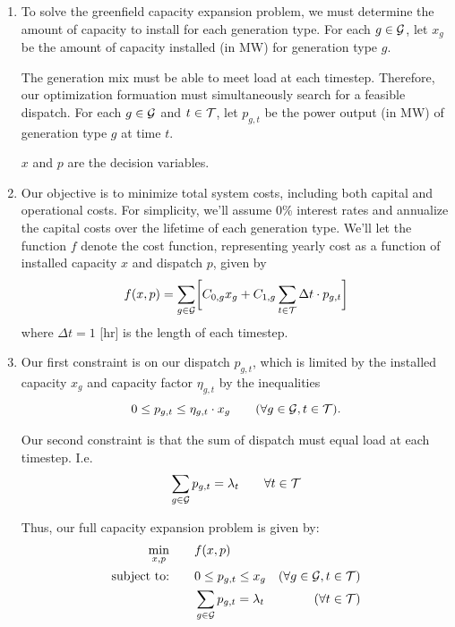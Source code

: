 \documentclass{homework}
\begin{document}
\begin{enumerate}
In summary, our parameters are $\eta$, $\lambda$, $C_0$ and $C_1$. 
(We drop the subscripts to denote the full vector/matrix across all members of pertinent sets.)

\item To solve the greenfield capacity expansion problem, we must determine the amount of capacity to install
for each generation type. For each $g\in \mathcal{G}$, let $x_g$ be the amount of capacity installed (in MW) for generation
type $g$.

The generation mix must be able to meet load at each timestep. Therefore, our optimization formuation must
simultaneously search for a feasible dispatch. For each $g\in\mathcal{G}$ and $t \in \mathcal{T}$, let $p_{g, t}$ be the power
output (in MW) of generation type $g$ at time $t$.

$x$ and $p$ are the decision variables.

\item Our objective is to minimize total system costs, including both capital and operational costs. For simplicity,
we'll assume 0\% interest rates and annualize the capital costs over the lifetime of each generation type. We'll
let the function $f$ denote the cost function, representing yearly cost as a function of installed capacity $x$ and dispatch $p$, given by
\begin{equation*}
    f(x, p) = \sum_{g\in\mathcal{G}} \biggl[C_{0, g} x_g + C_{1,g} \sum_{t\in\mathcal{T}} \Delta t \cdot p_{g,t} \biggr]
\end{equation*}
where $\Delta t = 1$ [hr] is the length of each timestep.

\item Our first constraint is on our dispatch $p_{g,t}$, which is limited by the installed capacity $x_g$ and capacity factor $\eta_{g,t}$
by the inequalities
\begin{equation*}
    0 \leq p_{g,t} \leq \eta_{g,t} \cdot x_g \qquad (\forall g\in\mathcal{G}, t\in\mathcal{T}).
\end{equation*}

Our second constraint is that the sum of dispatch must equal load at each timestep. I.e.
\begin{equation*}
    \sum_{g\in\mathcal{G}} p_{g,t} = \lambda_t \qquad {\forall t\in\mathcal{T}}
\end{equation*}

Thus, our full capacity expansion problem is given by:
\begin{align*}
     \min_{x, p} &\qquad f(x, p) \\
    \text{subject to:}  &\qquad
    0 \leq p_{g,t} \leq x_g & (\forall g\in\mathcal{G}, t\in\mathcal{T}) \\
    &\qquad \sum_{g\in\mathcal{G}} p_{g,t} = \lambda_t &(\forall t\in\mathcal{T})
\end{align*}



\end{enumerate}
\end{document}
